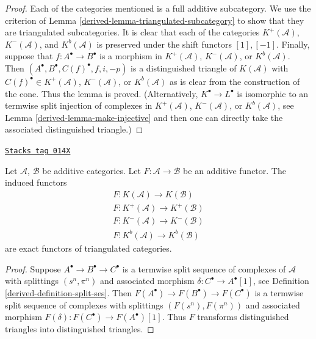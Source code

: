 \begin{proof}

Each of the categories mentioned is a full additive subcategory.
We use the criterion of
Lemma \ref{derived-lemma-triangulated-subcategory}
to show that they are triangulated subcategories.
It is clear that each of the categories
$K^{+}(\mathcal{A})$, $K^{-}(\mathcal{A})$, and $K^b(\mathcal{A})$
is preserved under the shift functors $[1], [-1]$.
Finally, suppose that $f : A^\bullet \to B^\bullet$ is a morphism
in $K^{+}(\mathcal{A})$, $K^{-}(\mathcal{A})$, or $K^b(\mathcal{A})$.
Then $(A^\bullet, B^\bullet, C(f)^\bullet, f, i, -p)$ is a distinguished
triangle of $K(\mathcal{A})$ with $C(f)^\bullet \in K^{+}(\mathcal{A})$,
$K^{-}(\mathcal{A})$, or $K^b(\mathcal{A})$ as is clear from the construction
of the cone. Thus the lemma is proved. (Alternatively,
$K^\bullet \to L^\bullet$ is isomorphic to an termwise split injection
of complexes in $K^{+}(\mathcal{A})$, $K^{-}(\mathcal{A})$, or
$K^b(\mathcal{A})$, see
Lemma \ref{derived-lemma-make-injective}
and then one can directly take the associated
distinguished triangle.)
\end{proof}

\begin{lemma}
\label{derived-lemma-additive-exact-homotopy-category}
\href{https://stacks.math.columbia.edu/tag/014X}{\texttt{Stacks tag 014X}}

Let $\mathcal{A}$, $\mathcal{B}$ be additive categories.
Let $F : \mathcal{A} \to \mathcal{B}$ be an additive functor.
The induced functors
$$
\begin{matrix}
F : K(\mathcal{A}) \longrightarrow K(\mathcal{B}) \\
F : K^{+}(\mathcal{A}) \longrightarrow K^{+}(\mathcal{B}) \\
F : K^{-}(\mathcal{A}) \longrightarrow K^{-}(\mathcal{B}) \\
F : K^b(\mathcal{A}) \longrightarrow K^b(\mathcal{B})
\end{matrix}
$$
are exact functors of triangulated categories.
\end{lemma}

\begin{proof}

Suppose $A^\bullet \to B^\bullet \to C^\bullet$
is a termwise split sequence of complexes of $\mathcal{A}$ with splittings
$(s^n, \pi^n)$ and associated morphism $\delta : C^\bullet \to A^\bullet[1]$,
see Definition \ref{derived-definition-split-ses}. Then
$F(A^\bullet) \to F(B^\bullet) \to F(C^\bullet)$
is a termwise split sequence of complexes with splittings
$(F(s^n), F(\pi^n))$ and associated morphism
$F(\delta) : F(C^\bullet) \to F(A^\bullet)[1]$.
Thus $F$ transforms distinguished triangles into distinguished triangles.
\end{proof}

